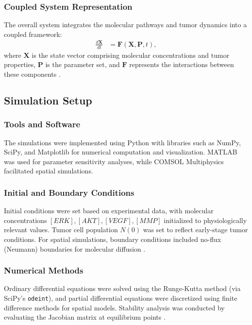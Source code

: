 \documentclass{article}
\theoremstyle{plain}
\theoremstyle{definition}
\begin{document}
\subsubsection{Coupled System Representation}
The overall system integrates the molecular pathways and tumor dynamics into a coupled framework:
\begin{align}
    \frac{d\mathbf{X}}{dt} &= \mathbf{F}(\mathbf{X}, \mathbf{P}, t),
\end{align}
where \( \mathbf{X} \) is the state vector comprising molecular concentrations and tumor properties, \( \mathbf{P} \) is the parameter set, and \( \mathbf{F} \) represents the interactions between these components \cite{strogatz2018nonlinear}.

\subsection{Simulation Setup}

\subsubsection{Tools and Software}
The simulations were implemented using Python with libraries such as NumPy, SciPy, and Matplotlib for numerical computation and visualization. MATLAB was used for parameter sensitivity analyses, while COMSOL Multiphysics facilitated spatial simulations.

\subsubsection{Initial and Boundary Conditions}
Initial conditions were set based on experimental data, with molecular concentrations \([ERK], [AKT], [VEGF], [MMP]\) initialized to physiologically relevant values. Tumor cell population \(N(0)\) was set to reflect early-stage tumor conditions. For spatial simulations, boundary conditions included no-flux (Neumann) boundaries for molecular diffusion \cite{harrison2019substanceP}.

\subsubsection{Numerical Methods}
Ordinary differential equations were solved using the Runge-Kutta method (via SciPy's \texttt{odeint}), and partial differential equations were discretized using finite difference methods for spatial models. Stability analysis was conducted by evaluating the Jacobian matrix at equilibrium points \cite{johnson2017biomodeling}.
\end{document}
